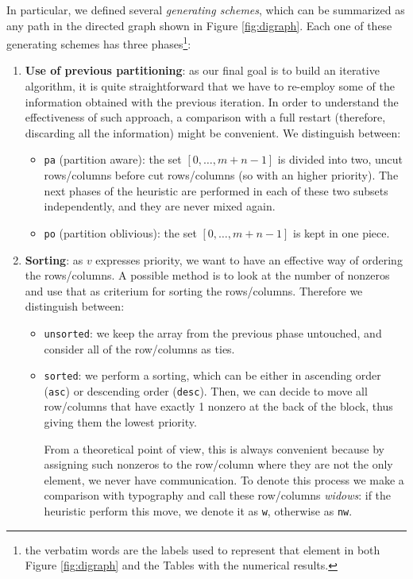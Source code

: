 In particular, we defined several \emph{generating schemes}, which can be summarized as any path in the directed graph shown in Figure \ref{fig:digraph}. Each one of these generating schemes has three phases\footnote{the verbatim words are the labels used to represent that element in both Figure \ref{fig:digraph} and the Tables with the numerical results.}:

\begin{enumerate}
 \item \textbf{Use of previous partitioning}: as our final goal is to build an iterative algorithm, it is quite straightforward that we have to re-employ some of the information obtained with the previous iteration. In order to understand the effectiveness of such approach, a comparison with a full restart (therefore, discarding all the information) might be convenient. We distinguish between:
 
  \begin{itemize}
 \item \verb|pa| (partition aware): the set $[0,\dots,m+n-1]$ is divided into two, uncut rows/columns before cut rows/columns (so with an higher priority). The next phases of the heuristic are performed in each of these two subsets independently, and they are never mixed again.
 \item \verb|po| (partition oblivious): the set $[0,\dots,m+n-1]$ is kept in one piece.
 \end{itemize}

 \item \textbf{Sorting}: as $v$ expresses priority, we want to have an effective way of ordering the rows/columns. A possible method is to look at the number of nonzeros and use that as criterium for sorting the rows/columns. Therefore we distinguish between:
 
 \begin{itemize}
  \item \verb|unsorted|: we keep the array from the previous phase untouched, and consider all of the row/columns as ties.
  \item \verb|sorted|: we perform a sorting, which can be either in ascending order (\verb|asc|) or descending order (\verb|desc|). Then, we can decide to move all row/columns that have exactly 1 nonzero at the back of the block, thus giving them the lowest priority.
  
  From a theoretical point of view, this is always convenient because by assigning such nonzeros to the row/column where they are not the only element, we never have communication. To denote this process we make a comparison with typography and call these row/columns \emph{widows}: if the heuristic perform this move, we denote it as \verb|w|, otherwise as \verb|nw|.
 \end{itemize}


\end{enumerate}
